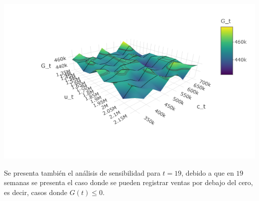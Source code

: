 \documentclass[
  us-letterpaper,
]{scrreprt}
\theoremstyle{definition}
\theoremstyle{plain}
\theoremstyle{plain}
\theoremstyle{remark}
\begin{document}
\begin{center}
\includegraphics[width=6.25in,height=\textheight]{fig-analisis2pdf.png}
\end{center}

Se presenta también el análisis de sensibilidad para \(t = 19\), debido
a que en \(19\) semanas se presenta el caso donde se pueden registrar
ventas por debajo del cero, es decir, casos donde \(G(t)\leq0\).
\end{document}
